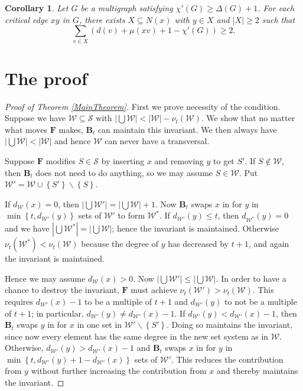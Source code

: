 \documentclass[12pt]{amsart}
\theoremstyle{plain}
\newtheorem{cor}[thm]{Corollary}
\theoremstyle{definition}
\theoremstyle{remark}
\newcommand{\fancy}[1]{\mathcal{#1}}
\newcommand{\set}[1]{\left\{ #1 \right\}}
\newcommand{\card}[1]{\left|#1\right|}
\newcommand{\parens}[1]{\left( #1 \right)}
\renewcommand{\S}{\fancy{S}}
\newcommand{\W}{\fancy{W}}
\newcommand{\F}{\mathbf{F}}
\newcommand{\B}{\mathbf{B}}
\newcommand{\myhat}[1]{#1^*}
\begin{document}
\begin{cor}\label{FanCor}
Let $G$ be a multigraph satisfying $\chi'(G) \ge \Delta(G) + 1$. For each critical edge $xy$ in $G$, there exists $X \subseteq N(x)$ with $y \in X$ and $\card{X} \geq 2$ such that
\[\sum_{v \in X} \parens{d(v) + \mu(xv) + 1 - \chi'(G)} \geq 2. \]
\end{cor}

\section{The proof}

\begin{proof}[Proof of Theorem \ref{MainTheorem}]
First we prove necessity of the condition. Suppose we have $\W \subseteq
\S$ with $\card{\bigcup \W} < \card{\W} - \nu_t(\W)$.  We show that no matter what moves
$\F$ makes, $\B_t$ can maintain this invariant. We then always have $\card{\bigcup \W} < \card{\W}$ and hence $\W$ can never have a
transversal. 

Suppose $\F$ modifies $S \in \S$ by inserting $x$ and removing $y$
to get $S'$.  If $S \not \in \W$, then $\B_t$ does not need to do anything, so we may assume $S \in
\W$. Put $\W' = \W \cup \set{S'} \smallsetminus \set{S}$.

If $d_{\W}(x) = 0$, then $\card{\bigcup \W'} = \card{\bigcup \W} + 1$. 
Now $\B_t$ swaps $x$ in for $y$ in $\min\set{t, d_{\W'}(y)}$ sets of $\W'$ to form $\myhat{\W}$.  
If $d_{\W'}(y) \leq t$, then $d_{\myhat{\W}}(y) = 0$ and we have $\card{\bigcup \myhat{\W}}
= \card{\bigcup \W}$; hence the invariant is maintained.  Otherwise $\nu_t(\myhat{\W}) <
\nu_t(\W)$ because the degree of $y$ has decreased by $t+1$, and again the invariant is maintained.

Hence we may assume $d_{\W}(x) > 0$.  Now $\card{\bigcup \W'} \le \card{\bigcup \W}$.  In order to have a chance to destroy the invariant, $\F$ must achieve $\nu_t(\W') > \nu_t(\W)$.  This requires $d_{\W'}(x) - 1$ to be a multiple of $t+1$ and $d_{\W'}(y)$ to not be a multiple of $t+1$; in particular, $d_{\W'}(y) \neq d_{\W'}(x) - 1$.  If $d_{\W'}(y) < d_{\W'}(x) - 1$, then $\B_t$ swaps $y$ in for $x$ in one set in $\W' \smallsetminus \set{S'}$.  Doing so maintains the invariant, since now every element has the same degree in the new set system as in $\W$.  Otherwise, $d_{\W'}(y) > d_{\W'}(x) - 1$ and $\B_t$ swaps $x$ in for $y$ in $\min\set{t, d_{\W'}(y) + 1 - d_{\W'}(x)}$ sets of $\W'$. This reduces the contribution from $y$ without further increasing the contribution from $x$ and thereby maintains the invariant.


\end{proof}
\end{document}
